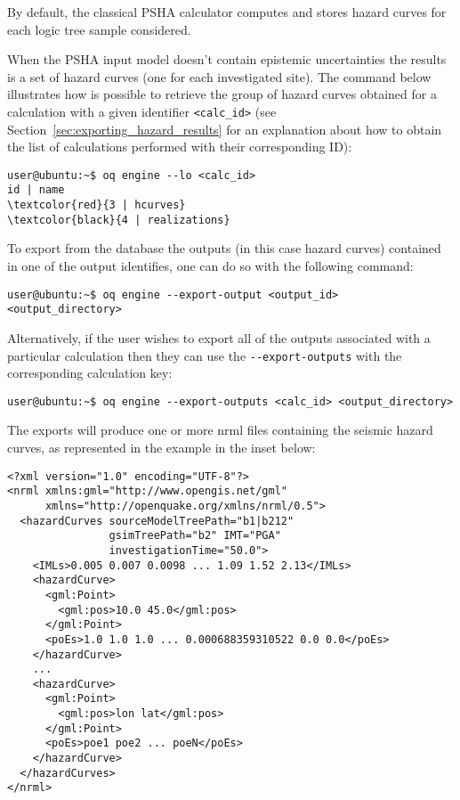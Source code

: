 By default, the classical PSHA calculator computes and stores hazard curves
for each logic tree sample considered.

When the PSHA input model doesn't contain epistemic uncertainties the results
is a set of hazard curves (one for each investigated site). The command below
illustrates how is possible to retrieve the group of hazard curves obtained
for a calculation with a given identifier \texttt{<calc\_id>} (see
Section~\ref{sec:exporting_hazard_results} for an explanation about how to
obtain the list of calculations performed with their corresponding ID):

\begin{Verbatim}[frame=single, commandchars=\\\{\}, fontsize=\small]
user@ubuntu:~$ oq engine --lo <calc_id>
id | name
\textcolor{red}{3 | hcurves}
\textcolor{black}{4 | realizations}
\end{Verbatim}

To export from the database the outputs (in this case hazard curves)  contained in one of the output identifies, one can do so with the following command:

\begin{Verbatim}[frame=single, commandchars=\\\{\}, fontsize=\small]
user@ubuntu:~$ oq engine --export-output <output_id> <output_directory>
\end{Verbatim}

Alternatively, if the user wishes to export all of the outputs associated with a particular calculation then they can use the \texttt{-{}-export-outputs} with the corresponding calculation key:

\begin{Verbatim}[frame=single, commandchars=\\\{\}, fontsize=\small]
user@ubuntu:~$ oq engine --export-outputs <calc_id> <output_directory>
\end{Verbatim}

The exports will produce one or more nrml files containing the seismic hazard curves, as represented in the example in the inset below:

\begin{verbatim}
<?xml version="1.0" encoding="UTF-8"?>
<nrml xmlns:gml="http://www.opengis.net/gml"
      xmlns="http://openquake.org/xmlns/nrml/0.5">
  <hazardCurves sourceModelTreePath="b1|b212"
                gsimTreePath="b2" IMT="PGA"
                investigationTime="50.0">
    <IMLs>0.005 0.007 0.0098 ... 1.09 1.52 2.13</IMLs>
    <hazardCurve>
      <gml:Point>
        <gml:pos>10.0 45.0</gml:pos>
      </gml:Point>
      <poEs>1.0 1.0 1.0 ... 0.000688359310522 0.0 0.0</poEs>
    </hazardCurve>
    ...
    <hazardCurve>
      <gml:Point>
        <gml:pos>lon lat</gml:pos>
      </gml:Point>
      <poEs>poe1 poe2 ... poeN</poEs>
    </hazardCurve>
  </hazardCurves>
</nrml>
\end{verbatim}

